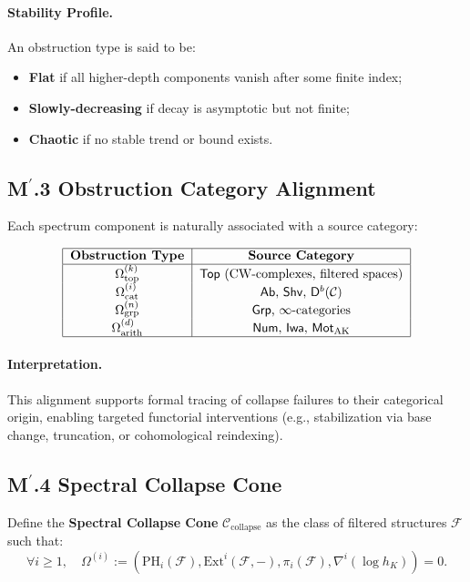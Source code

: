 \documentclass[11pt]{article}
\begin{document}
\paragraph{Stability Profile.}  
An obstruction type is said to be:
\begin{itemize}
    \item \textbf{Flat} if all higher-depth components vanish after some finite index;
    \item \textbf{Slowly-decreasing} if decay is asymptotic but not finite;
    \item \textbf{Chaotic} if no stable trend or bound exists.
\end{itemize}

\subsection*{M$^\prime$.3 Obstruction Category Alignment}

Each spectrum component is naturally associated with a source category:

\[
\begin{tabular}{|c|c|}
\hline
\textbf{Obstruction Type} & \textbf{Source Category} \\
\hline
$\Omega_{\mathrm{top}}^{(k)}$ & $\mathsf{Top}$ (CW-complexes, filtered spaces) \\
$\Omega_{\mathrm{cat}}^{(i)}$ & $\mathsf{Ab}$, $\mathsf{Shv}$, $\mathsf{D}^b(\mathcal{C})$ \\
$\Omega_{\mathrm{grp}}^{(n)}$ & $\mathsf{Grp}$, $\infty$-categories \\
$\Omega_{\mathrm{arith}}^{(d)}$ & $\mathsf{Num}$, $\mathsf{Iwa}$, $\mathsf{Mot}_{\mathrm{AK}}$ \\
\hline
\end{tabular}
\]

\paragraph{Interpretation.}  
This alignment supports formal tracing of collapse failures to their categorical origin, enabling targeted functorial interventions (e.g., stabilization via base change, truncation, or cohomological reindexing).

\subsection*{M$^\prime$.4 Spectral Collapse Cone}

Define the \textbf{Spectral Collapse Cone} $\mathcal{C}_{\mathrm{collapse}}$ as the class of filtered structures $\mathcal{F}$ such that:
\[
\forall i \geq 1, \quad \Omega^{(i)} := 
\left( \mathrm{PH}_i(\mathcal{F}), \mathrm{Ext}^i(\mathcal{F}, -), \pi_i(\mathcal{F}), \nabla^i(\log h_K) \right)
= 0.
\]
\end{document}

